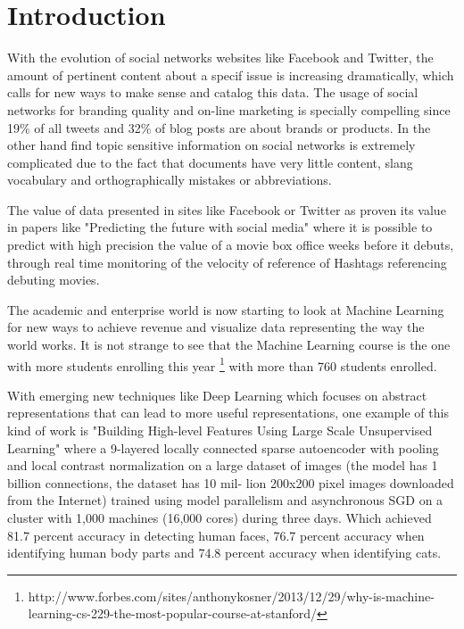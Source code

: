 
\section{Introduction}

With the evolution of social networks websites like Facebook and Twitter, the amount of pertinent content about a specif issue is increasing dramatically, which calls for new ways to make sense and catalog this data.
The usage of social networks for branding quality and on-line marketing is specially compelling since 19\% of all tweets \cite{Jansen2009} and 32\% \cite{Melville2009} of blog posts are about brands or products.
In the other hand find topic sensitive information on social networks is extremely complicated due to the fact that documents have very little content, slang vocabulary and orthographically mistakes or abbreviations.

The value of data presented in sites like Facebook or Twitter as proven its value in papers like "Predicting the future with social media"  \citet{Asur2010} where it is possible to predict with high precision the value of a movie box office weeks before it debuts, through real time monitoring of the velocity of reference of Hashtags referencing debuting movies.

The academic and enterprise world is now starting to look at Machine Learning for new ways to achieve revenue and visualize data representing the way the world works. It is not strange to see that the Machine Learning course is the one with more students enrolling this year \footnote{http://www.forbes.com/sites/anthonykosner/2013/12/29/why-is-machine-learning-cs-229-the-most-popular-course-at-stanford/} with more than 760 students enrolled.

With emerging new techniques like Deep Learning \citet{Bengio2013} which focuses on abstract representations that can lead to more useful representations, one example of this kind of work is \citet{Le2011} "Building High-level Features Using Large Scale Unsupervised Learning" where a 9-layered locally connected sparse autoencoder with pooling and local contrast normalization on a large dataset of images (the model has 1 billion connections, the dataset has 10 mil- lion 200x200 pixel images downloaded from the Internet) trained using model parallelism and asynchronous SGD on a cluster with 1,000 machines (16,000 cores) during three days. Which achieved 81.7 percent accuracy in detecting human faces, 76.7 percent accuracy when identifying human body parts and 74.8 percent accuracy when identifying cats.

